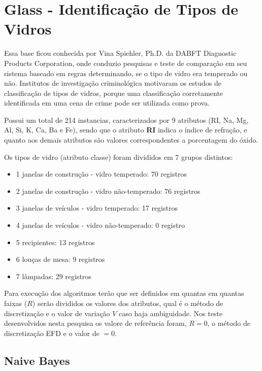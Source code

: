 \section{Glass - Identificação de Tipos de Vidros}\label{cap:resultados:ssec:iris}

Essa base ficou conhecida por Vina Spiehler, Ph.D. da DABFT Diagnostic Products Corporation, onde conduzio pesquisas e teste de comparação em seu sistema baseado em regras determinando, se o tipo de vidro era temperado ou não. Institutos de investigação criminológica motivaram os estudos de classificação de tipos de vidros, porque uma classificação corretamente identificada em uma cena de crime pode ser utilizada como prova.

Possui um total de 214 instancias, caracterizados por 9 atributos (RI, Na, Mg, Al, Si, K, Ca, Ba e Fe), sendo que o atributo \textbf{RI} indica o índice de refração, e quanto aos demais atributos são valores correspondentes a porcentagem do óxido.

Os tipos de vidro (atributo classe) foram divididos em 7 grupos distintos:
\begin{itemize}
 \item 1 janelas de construção - vidro temperado: 70 registros
 \item 2 janelas de construção - vidro não-temperado: 76 registros
 \item 3 janelas de veículos - vidro temperado: 17 registros
 \item 4 janelas de veículos - vidro não-temperado: 0 registro
 \item 5 recipientes: 13 registros
 \item 6 louças de mesa: 9 registros
 \item 7 lâmpadas: 29 registros
\end{itemize}

Para execução dos algoritmos terão que ser definidos em quantas em quantas faixas (${R}$) serão divididos os valores dos atributos, qual é o método de discretização e o valor de variação ${V}$ caso haja ambiguidade. Nos teste desenvolvidos nesta pesquisa os valore de referência foram, ${R=0}$, o método de discretização EFD e o valor de ${=0}$.


\subsection{Naive Bayes} \label{cap:resultados:ssec:glass:nb}




